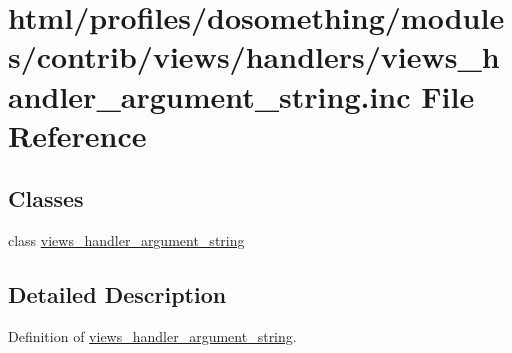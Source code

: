 \hypertarget{views__handler__argument__string_8inc}{
\section{html/profiles/dosomething/modules/contrib/views/handlers/views\_\-handler\_\-argument\_\-string.inc File Reference}
\label{views__handler__argument__string_8inc}
}
\subsection*{Classes}
\begin{DoxyCompactItemize}
\item 
class \hyperlink{classviews__handler__argument__string}{views\_\-handler\_\-argument\_\-string}
\end{DoxyCompactItemize}


\subsection{Detailed Description}
Definition of \hyperlink{classviews__handler__argument__string}{views\_\-handler\_\-argument\_\-string}. 